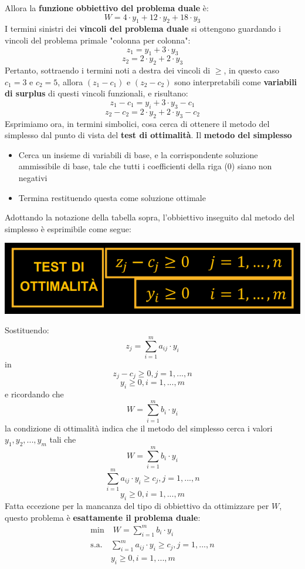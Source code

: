 \documentclass[12pt]{article}
\begin{document}
Allora la \textbf{funzione obbiettivo del problema duale} è:
$$W = 4 \cdot y_1 + 12 \cdot y_2 + 18 \cdot y_3$$
I termini sinistri dei \textbf{vincoli del problema duale} si ottengono guardando i vincoli del problema primale "colonna per colonna":
$$z_1 = y_1 + 3 \cdot y_3$$
$$z_2 = 2 \cdot y_2 + 2 \cdot y_3$$
Pertanto, sottraendo i termini noti a destra dei vincoli di $\geq$, in questo caso $c_1 = 3$ e $c_2 =5$, allora
$(z_1 - c_1)$ e $(z_2 - c_2)$ sono interpretabili come \textbf{variabili di surplus} di questi vincoli funzionali, e risultano:
$$z_1 - c_1 = y_i + 3 \cdot y_3 - c_1$$
$$z_2 - c_2 = 2 \cdot y_2 + 2 \cdot y_3 - c_2$$
Esprimiamo ora, in termini simbolici, cosa cerca di ottenere il metodo del simplesso dal punto di vista del \textbf{test di ottimalità}. Il 
\textbf{metodo del simplesso}
\begin{itemize}
    \item Cerca un insieme di variabili di base, e la corrispondente soluzione ammissibile di base, tale che tutti i coefficienti della riga (0) siano non negativi
    \item Termina restituendo questa come soluzione ottimale
\end{itemize}
Adottando la notazione della tabella sopra, l'obbiettivo inseguito dal metodo del simplesso è esprimibile come segue:
\begin{center}
    \includegraphics[width = 0.45\linewidth]{Images/48.png}
\end{center}
Sostituendo:
$$z_j = \sum_{i=1}^{m} a_{ij} \cdot y_i$$
in
$$z_j - c_j \geq 0, j = 1,...,n$$
$$y_i \geq 0, i = 1,...,m$$
e ricordando che
$$W = \sum_{i=1}^{m} b_i \cdot y_i$$
la condizione di ottimalità indica che il metodo del simplesso cerca i valori $y_1, y_2, ..., y_m$ tali che
$$W = \sum_{i=1}^{m} b_i \cdot y_i$$
$$\sum_{i=1}^{m} a_{ij} \cdot y_i \geq c_j, j= 1,...,n$$
$$y_i \geq 0, i = 1,...,m$$
Fatta eccezione per la mancanza del tipo di obbiettivo da ottimizzare per $W$, questo problema è \textbf{esattamente il problema duale}:
\begin{equation*}
    \begin{array}{ll}
        \displaystyle \textrm{min} & \; W = \sum_{i=1}^m b_i \cdot y_i\\
        \textrm{s.a.} & \sum_{i=1}^m a_{ij} \cdot y_i \geq c_j, j= 1,...,n\\
        \phantom{} & y_i \geq 0, i=1,...,m
    \end{array}
\end{equation*}
\end{document}
